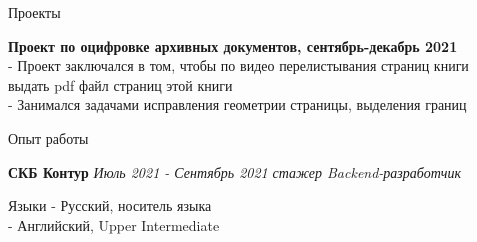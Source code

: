 \documentclass{resume} %
\begin{document}
\begin{rSection}{Проекты}

{\bf Проект по оцифровке архивных документов, сентябрь-декабрь 2021}
\\-  Проект заключался в том, чтобы по видео перелистывания страниц книги выдать pdf файл страниц этой книги
\\- Занимался задачами исправления геометрии страницы, выделения границ
\end{rSection}


\begin{rSection}{Опыт работы}

{\bf СКБ Контур } \hfill {\em Июль 2021 - Сентябрь 2021} 
{\textit{стажер Backend-разработчик}}\\




\end{rSection}
\begin{rSection}{Языки}
- Русский, носитель языка\\
- Английский, Upper Intermediate\\

\end{rSection}

\end{document}
